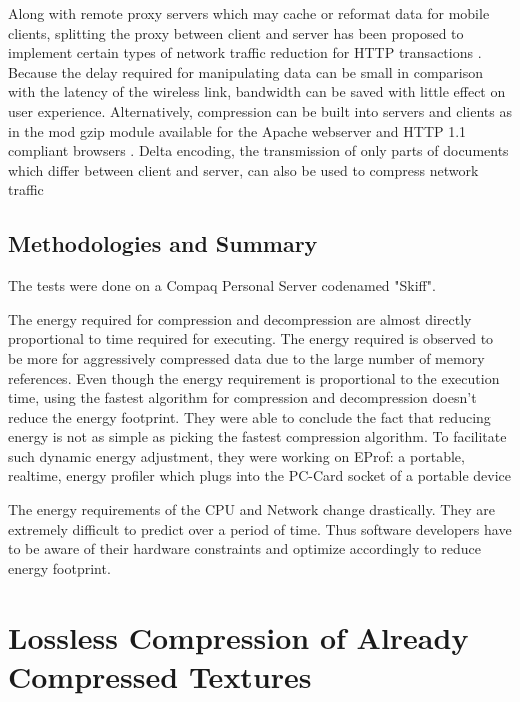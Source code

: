 \documentclass{article}
\begin{document}
Along with remote proxy servers which may cache or
reformat data for mobile clients, splitting the proxy between client and server has been proposed to implement certain types of network traffic reduction for HTTP transactions \cite{housel1996webexpress} \cite{krashinsky2003efficient}. Because the delay required for manipulating data can be small in comparison with the latency
of the wireless link, bandwidth can be saved with little
effect on user experience. Alternatively, compression
can be built into servers and clients as in the mod gzip
module available for the Apache webserver and HTTP
1.1 compliant browsers \cite{hyperspace}. Delta encoding, the transmission of only parts of documents which differ between
client and server, can also be used to compress network
traffic \cite{hunt1996empirical} \cite{mogul1999trace} \cite{mogul1997potential} \cite{santos1998increasing}


\subsection{Methodologies and Summary}
The tests were done on a Compaq Personal Server codenamed "Skiff".\cite{compaq}

The energy required for compression and decompression are almost directly proportional to time required for executing. The energy required is observed to be more for aggressively compressed data due to the large number of memory references. Even though the energy requirement is proportional to the execution time, using the fastest algorithm for compression and decompression doesn't reduce the energy footprint. They were able to conclude the fact that reducing energy is not as simple as picking the fastest compression algorithm. To facilitate such dynamic energy adjustment, they were working on EProf: a portable, realtime, energy profiler which plugs into the PC-Card socket of a portable device \cite{koskelin2002eprof}

The energy requirements of the CPU and Network change drastically. They are extremely difficult to predict over a period of time. Thus software developers have to be aware of their hardware constraints and optimize accordingly to reduce energy footprint. 

\section{Lossless Compression of Already Compressed Textures \cite{strom2011lossless}}
\end{document}
